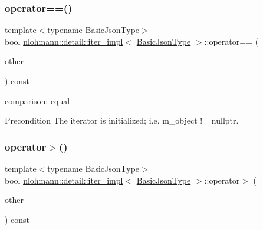 \subsubsection{\texorpdfstring{operator==()}{operator==()}}
{\footnotesize\ttfamily template$<$typename Basic\+Json\+Type$>$ \\
bool \hyperlink{classnlohmann_1_1detail_1_1iter__impl}{nlohmann\+::detail\+::iter\+\_\+impl}$<$ \hyperlink{classnlohmann_1_1detail_1_1iter__impl_abf18f18793f84b0222aebb5a2a87da7a}{Basic\+Json\+Type} $>$\+::operator== (\begin{DoxyParamCaption}\item[{const \hyperlink{classnlohmann_1_1detail_1_1iter__impl}{iter\+\_\+impl}$<$ \hyperlink{classnlohmann_1_1detail_1_1iter__impl_abf18f18793f84b0222aebb5a2a87da7a}{Basic\+Json\+Type} $>$ \&}]{other }\end{DoxyParamCaption}) const\hspace{0.3cm}{\ttfamily [inline]}}



comparison\+: equal 

\begin{DoxyPrecond}{Precondition}
The iterator is initialized; i.\+e. {\ttfamily m\+\_\+object != nullptr}. 
\end{DoxyPrecond}
\mbox{\label{classnlohmann_1_1detail_1_1iter__impl_aaf3620b8dfa4bed8a9ac2b51dd55dbd7}} 
\subsubsection{\texorpdfstring{operator$>$()}{operator>()}}
{\footnotesize\ttfamily template$<$typename Basic\+Json\+Type$>$ \\
bool \hyperlink{classnlohmann_1_1detail_1_1iter__impl}{nlohmann\+::detail\+::iter\+\_\+impl}$<$ \hyperlink{classnlohmann_1_1detail_1_1iter__impl_abf18f18793f84b0222aebb5a2a87da7a}{Basic\+Json\+Type} $>$\+::operator$>$ (\begin{DoxyParamCaption}\item[{const \hyperlink{classnlohmann_1_1detail_1_1iter__impl}{iter\+\_\+impl}$<$ \hyperlink{classnlohmann_1_1detail_1_1iter__impl_abf18f18793f84b0222aebb5a2a87da7a}{Basic\+Json\+Type} $>$ \&}]{other }\end{DoxyParamCaption}) const\hspace{0.3cm}{\ttfamily [inline]}}



